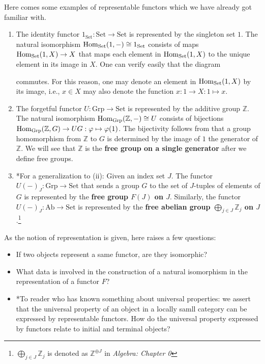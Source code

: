 	\begin{example}
	Here comes some examples of representable functors which we have already got familiar with.
		\begin{enumerate}[label=(\roman*)]
			\item The identity functor $1_\mathrm{Set}:\mathrm{Set}\to\mathrm{Set}$ is represented by the singleton set $1$. The natural isomorphism $\operatorname{Hom}_\mathrm{Set}(1,-)\cong 1_\mathrm{Set}$ consists of maps $\operatorname{Hom}_\mathrm{Set}(1,X)\to X$ that maps each element in $\operatorname{Hom}_\mathrm{Set}(1,X)$ to the unique element in its image in $X$. One can verify easily that the diagram 
			\begin{center}
			\end{center}
		commutes. For this reason, one may denote an element in $\operatorname{Hom}_\mathrm{Set}(1,X)$ by its image, i.e., $x\in X$ may also denote the function $x:1\to X:1\mapsto x$.
		\item The forgetful functor $U:\mathrm{Grp}\to \mathrm{Set}$ is represented by the additive group $\mathbb{Z}$. The natural isomorphism $\operatorname{Hom}_\mathrm{Grp}(\mathbb{Z},-)\cong U$ consists of bijections $\operatorname{Hom}_\mathrm{Grp}(\mathbb{Z},G)\to UG:\varphi\mapsto \varphi(1)$. The bijectivity follows from that a group homomorphism from $\mathbb{Z}$ to $G$ is determined by the image of $1$ the generator of $\mathbb{Z}$. We will see that $\mathbb{Z}$ is the \textbf{free group on a single generator} after we define free groups.
		\item *For a generalization to (ii): Given an index set $J$. The functor $U(-)_J:\mathrm{Grp}\to\mathrm{Set}$ that sends a group $G$ to the set of $J$-tuples of elements of $G$ is represented by the \textbf{free group $F(J)$ on $J$}. Similarly, the functor $U(-)_J:\mathrm{Ab}\to \mathrm{Set}$ is represented by the \textbf{free abelian group $\bigoplus_{j\in J}\mathbb{Z}_j$ on $J$}.\footnote{$\bigoplus_{j\in J}\mathbb{Z}_j$ is denoted as $\mathbb{Z}^{\oplus J}$ in \textsl{Algebra: Chapter 0}}
		\end{enumerate}
	\end{example}
	As the notion of representation is given, here raises a few questions:
	\begin{itemize}
		\item If two objects represent a same functor, are they isomorphic?
		\item What data is involved in the construction of a natural isomorphism in the representation of a functor $F$?
		\item *To reader who has known something about universal properties: we assert that the universal property of an object in a locally samll category can be expressed by representable functors. How do the universal property expressed by functors relate to initial and terminal objects?
	\end{itemize}
